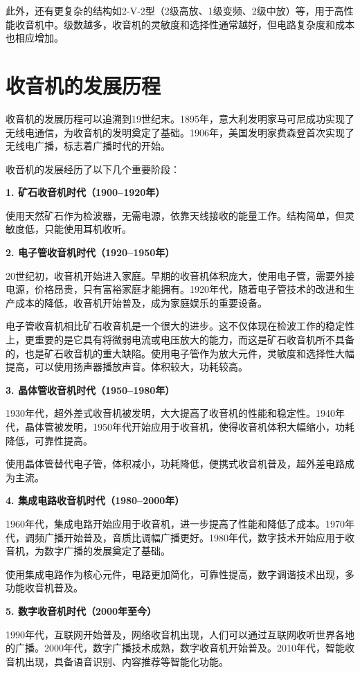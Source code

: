 \documentclass[12pt,UTF8]{ctexbook}
\begin{document}
此外，还有更复杂的结构如2-V-2型（2级高放、1级变频、2级中放）等，用于高性能收音机中。级数越多，收音机的灵敏度和选择性通常越好，但电路复杂度和成本也相应增加。

\section{收音机的发展历程}

收音机的发展历程可以追溯到19世纪末。1895年，意大利发明家马可尼成功实现了无线电通信，为收音机的发明奠定了基础。1906年，美国发明家费森登首次实现了无线电广播，标志着广播时代的开始。

收音机的发展经历了以下几个重要阶段：

\textbf{1. 矿石收音机时代（1900--1920年）}

使用天然矿石作为检波器，无需电源，依靠天线接收的能量工作。结构简单，但灵敏度低，只能使用耳机收听。

\textbf{2. 电子管收音机时代（1920--1950年）}

20世纪初，收音机开始进入家庭。早期的收音机体积庞大，使用电子管，需要外接电源，价格昂贵，只有富裕家庭才能拥有。1920年代，随着电子管技术的改进和生产成本的降低，收音机开始普及，成为家庭娱乐的重要设备。

电子管收音机相比矿石收音机是一个很大的进步。这不仅体现在检波工作的稳定性上，更重要的是它具有将微弱电流或电压放大的能力，而这是矿石收音机所不具备的，也是矿石收音机的重大缺陷。使用电子管作为放大元件，灵敏度和选择性大幅提高，可以使用扬声器播放声音。体积较大，功耗较高。

\textbf{3. 晶体管收音机时代（1950--1980年）}

1930年代，超外差式收音机被发明，大大提高了收音机的性能和稳定性。1940年代，晶体管被发明，1950年代开始应用于收音机，使得收音机体积大幅缩小，功耗降低，可靠性提高。

使用晶体管替代电子管，体积减小，功耗降低，便携式收音机普及，超外差电路成为主流。

\textbf{4. 集成电路收音机时代（1980--2000年）}

1960年代，集成电路开始应用于收音机，进一步提高了性能和降低了成本。1970年代，调频广播开始普及，音质比调幅广播更好。1980年代，数字技术开始应用于收音机，为数字广播的发展奠定了基础。

使用集成电路作为核心元件，电路更加简化，可靠性提高，数字调谐技术出现，多功能收音机普及。

\textbf{5. 数字收音机时代（2000年至今）}

1990年代，互联网开始普及，网络收音机出现，人们可以通过互联网收听世界各地的广播。2000年代，数字广播技术成熟，数字收音机开始普及。2010年代，智能收音机出现，具备语音识别、内容推荐等智能化功能。
\end{document}
